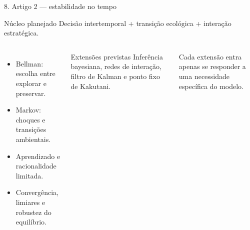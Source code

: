 \documentclass[aspectratio=169,11pt]{beamer}
\begin{document}
\begin{frame}{8. Artigo 2 — estabilidade no tempo}
  \begin{block}{Núcleo planejado}
    Decisão intertemporal + transição ecológica + interação estratégica.
  \end{block}

  \begin{columns}[T,onlytextwidth]
      \begin{itemize}
        \item Bellman: escolha entre explorar e preservar.
        \item Markov: choques e transições ambientais.
        \item Aprendizado e racionalidade limitada.
        \item Convergência, limiares e robustez do equilíbrio.
      \end{itemize}

      \begin{block}{Extensões previstas}
        Inferência bayesiana, redes de interação, filtro de Kalman e ponto fixo
        de Kakutani.
      \end{block}
      \vspace{0.2cm}
      Cada extensão entra apenas se responder a uma necessidade específica do
      modelo.
  \end{columns}

\end{frame}
\end{document}
